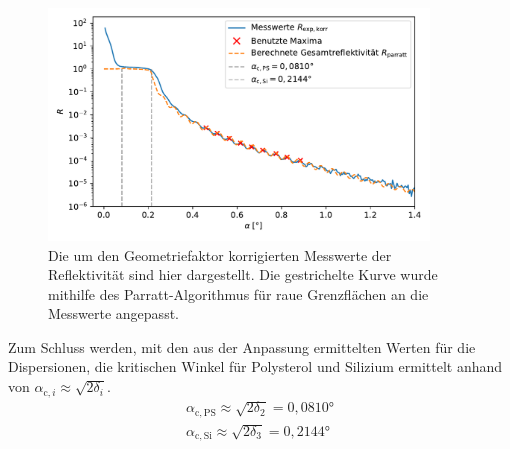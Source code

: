     \begin{figure}[ht]
        \centering
        \includegraphics[width = 0.9\textwidth]{plots/Reflektivitaetskurve2.pdf}
        \caption{Die um den Geometriefaktor korrigierten Messwerte der Reflektivität sind hier dargestellt. Die gestrichelte Kurve wurde mithilfe des Parratt-Algorithmus für raue Grenzflächen an die Messwerte angepasst.}
        \label{fig:Reflektivitaetskurve2}
    \end{figure}

    Zum Schluss werden, mit den aus der Anpassung ermittelten Werten für die Dispersionen, die kritischen Winkel für Polysterol und Silizium ermittelt anhand von $\alpha_{\mathrm{c,}i} \approx \sqrt{2 \delta_i}$.
    \begin{align*}
        \alpha_{\mathrm{c,PS}} \approx \sqrt{2 \delta_2} = 0,0810° \\
        \alpha_{\mathrm{c,Si}} \approx \sqrt{2 \delta_3} = 0,2144°
    \end{align*}